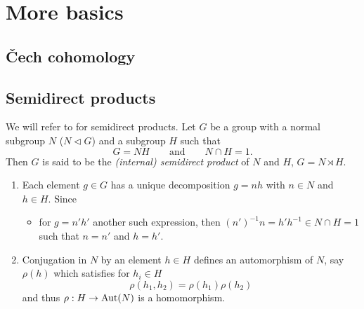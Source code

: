 \chapter{More basics}

\section{Čech cohomology}

\section{Semidirect products}
\begin{comment}
  see
  \begin{itemize}
    \item \url{http://nlab.mathforge.org/nlab/show/semidirect+product+group}
    \item \url{http://en.wikipedia.org/wiki/Semidirect_product}
    \item \cite{Robinson2003An}
  \end{itemize}
\end{comment}
We will refer to \cite[75]{Robinson2003An} for semidirect products.
Let $G$ be a group with a normal subgroup $N$ ($N\vartriangleleft G$) and a
subgroup $H$ such that 
\[
  G=NH\qquad\text{and}\qquad N\cap H=1.
\]
Then $G$ is said to be the \emph{(internal) semidirect product} of $N$ and $H$,
$G=N\rtimes H$.
\begin{rem}
  \begin{enumerate}
    \item Each element $g\in G$ has a unique decomposition $g=nh$ with $n\in N$
      and $h\in H$. Since
      \begin{itemize}
        \item[] for $g=n'h'$ another such expression, then
          $(n')^{-1}n=h'h^{-1}\in N\cap H=1$ such that $n=n'$ and $h=h'$.
      \end{itemize}
    \item Conjugation in $N$ by an element $h\in H$ defines an automorphism of
      $N$, say $\rho(h)$ which satisfies for $h_i\in H$
      \[
        \rho(h_1,h_2)=\rho(h_1)\rho(h_2)
      \]
      and thus $\rho:H\to\operatorname{Aut}(N)$ is a homomorphism.
  \end{enumerate}
\end{rem}
